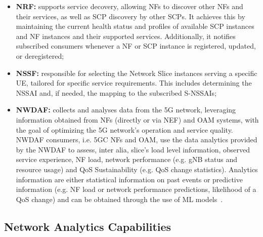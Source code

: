 \begin{itemize}
    \item{\textbf{\acf{NRF}:}} supports service decovery, allowing \acp{NF} to discover other \acp{NF} and their services, as well as \acs{SCP} discovery by other \acsp{SCP}. It achieves this by maintaining the current health status and profiles of available \ac{SCP} instances and \ac{NF} instances and their supported services. Additionally, it notifies subscribed consumers whenever a \ac{NF} or \ac{SCP} instance is registered, updated, or deregistered;

    \item{\textbf{\acf{NSSF}:}} responsible for selecting the Network Slice instances serving a specific \ac{UE}, tailored for specific service requirements. This includes determining the \ac{NSSAI} and, if needed, the mapping to the subscribed \acp{S-NSSAI};

    \item{\textbf{\acf{NWDAF}:}} collects and analyses data from the \ac{5G} network, leveraging information obtained from \acp{NF} (directly or via \ac{NEF}) and \ac{OAM} systems, with the goal of optimizing the \acs{5G} network's operation and service quality. \ac{NWDAF} consumers, i.e. \ac{5GC} \acp{NF} and \ac{OAM}, use the data analytics provided by the \ac{NWDAF} to assess, inter alia, slice's load level information, observed service experience, \ac{NF} load, network performance (e.g. \ac{gNB} status and resource usage) and \ac{QoS} Sustainability (e.g. \ac{QoS} change statistics). Analytics information are either statistical information on past events or predictive information (e.g. \ac{NF} load or network performance predictions, likelihood of a \ac{QoS} change) and can be obtained through the use of \ac{ML} models~\cite{ETSI_TS_123_288_V18_11_0}.

    


\end{itemize}


\subsection{Network Analytics Capabilities}


